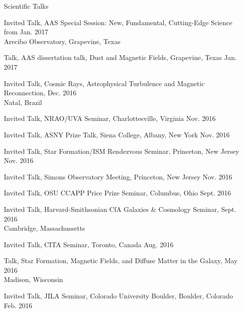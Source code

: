 \documentclass{resume_clark} %
\begin{document}
\begin{rSection}{Scientific Talks}
\begin{etaremune}[itemsep=-1.8mm]
\item Invited Talk, AAS Special Session: New, Fundamental, Cutting-Edge Science from \hfill{Jan. 2017} \\ Arecibo Observatory, Grapevine, Texas

\item Talk, AAS dissertation talk, Dust and Magnetic Fields, Grapevine, Texas \hfill{Jan. 2017}

\item Invited Talk, Cosmic Rays, Astrophysical Turbulence and Magnetic Reconnection, \hfill{Dec. 2016}\\
Natal, Brazil 

\item Invited Talk, NRAO/UVA Seminar, Charlottesville, Virginia \hfill{Nov. 2016}

\item Invited Talk, ASNY Prize Talk, Siena College, Albany, New York \hfill{Nov. 2016}

\item Invited Talk, Star Formation/ISM Rendezvous Seminar, Princeton, New Jersey \hfill{Nov. 2016}

\item Invited Talk, Simons Observatory Meeting, Princeton, New Jersey \hfill{Nov. 2016}

\item Invited Talk, OSU CCAPP Price Prize Seminar, Columbus, Ohio \hfill{Sept. 2016}

\item Invited Talk, Harvard-Smithsonian CfA Galaxies \& Cosmology Seminar, \hfill{Sept. 2016}\\
Cambridge, Massachussetts

\item Invited Talk, CITA Seminar, Toronto, Canada \hfill {Aug. 2016}

\item Talk, Star Formation, Magnetic Fields, and Diffuse Matter in the Galaxy, \hfill{May 2016}\\
Madison, Wisconsin 

\item Invited Talk, JILA Seminar, Colorado University Boulder, Boulder, Colorado \hfill {Feb. 2016}


\end{etaremune}
\end{rSection}
\end{document}
